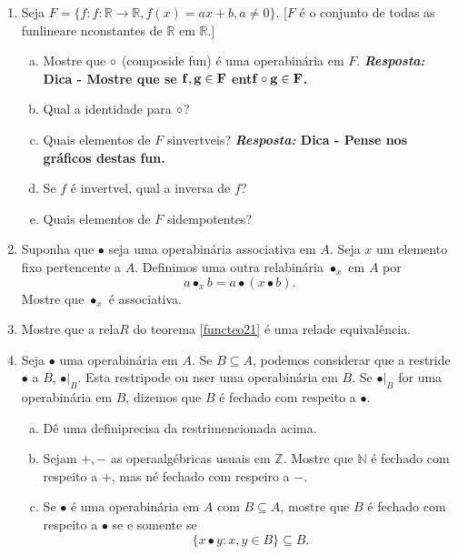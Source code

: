\begin{enumerate}[{\bf 1.}]
\item Seja $F=\{f: f:\mathbb{R}\to\mathbb{R}, f(x)=ax+b, a\neq 0\}$. [$F$ \'e o conjunto de todas as fun\coes lineare n\ao constantes de $\mathbb{R}$ em $\mathbb{R}$.]
\begin{enumerate}[a)]
\item Mostre que $\circ$ (composi\cao de fun\cois) \'e uma opera\cao bin\'aria em $F$. {\bf{\it Resposta:} Dica - Mostre que se ${\bf f,g\in F}$ ent\ao ${\bf f\circ g\in F}$.}
\item Qual a identidade para $\circ$?
\item Quais elementos de $F$ s\ao invert\ih veis? {\bf{\it Resposta:} Dica - Pense nos gr\'aficos destas fun\cois.}
\item Se $f$ \'e invert\ih vel, qual a inversa de $f$?
\item Quais elementos de $F$ s\ao idempotentes? 
\end{enumerate}

\item Suponha que $\bullet$ seja uma opera\cao bin\'aria associativa em $A$. Seja $x$ um elemento fixo pertencente a $A$. Definimos uma outra rela\cao bin\'aria $\bullet_x$ em $A$ por
\[
a\bullet_x b=a\bullet(x\bullet b).
\]
Mostre que $\bullet_x$ \'e associativa.

\item Mostre que a rela\cao $R$ do teorema \ref{functeo21} \'e uma rela\cao de equival\^encia.

\item Seja $\bullet$ uma opera\cao bin\'aria em $A$. Se $B\subseteq A$, podemos considerar que a restri\cao de $\bullet$ a $B$, $\bullet|_B$. Esta restri\cao pode ou n\ao ser uma opera\cao bin\'aria em $B$. Se $\bullet|_B$ for uma opera\cao bin\'aria em $B$, dizemos que $B$ \'e fechado com respeito a $\bullet$. 
\begin{enumerate}[a)]
\item D\^e uma defini\cao precisa da restri\cao mencionada acima.
\item Sejam $+,-$ as opera\coes alg\'ebricas usuais em $\mathbb{Z}$. Mostre que $\mathbb{N}$ \'e fechado com respeito a $+$, mas n\ao \'e fechado com respeiro a $-$.
\item Se $\bullet$ \'e uma opera\cao bin\'aria em $A$ com $B\subseteq A$, mostre que $B$ \'e fechado com respeito a $\bullet$ se e somente se 
\[
\{x\bullet y: x,y\in B\}\subseteq B.
\]
\end{enumerate}


\end{enumerate}
